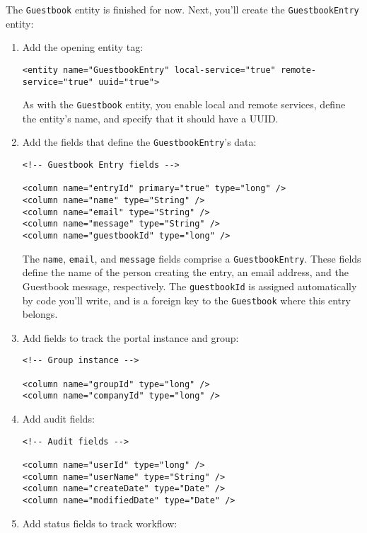 The \texttt{Guestbook} entity is finished for now. Next, you'll create
the \texttt{GuestbookEntry} entity:

\begin{enumerate}
\def\labelenumi{\arabic{enumi}.}
\item
  Add the opening entity tag:

\begin{verbatim}
<entity name="GuestbookEntry" local-service="true" remote-service="true" uuid="true">
\end{verbatim}

  As with the \texttt{Guestbook} entity, you enable local and remote
  services, define the entity's name, and specify that it should have a
  UUID.
\item
  Add the fields that define the \texttt{GuestbookEntry}'s data:

\begin{verbatim}
<!-- Guestbook Entry fields -->

<column name="entryId" primary="true" type="long" />
<column name="name" type="String" />
<column name="email" type="String" />
<column name="message" type="String" />
<column name="guestbookId" type="long" />
\end{verbatim}

  The \texttt{name}, \texttt{email}, and \texttt{message} fields
  comprise a \texttt{GuestbookEntry}. These fields define the name of
  the person creating the entry, an email address, and the Guestbook
  message, respectively. The \texttt{guestbookId} is assigned
  automatically by code you'll write, and is a foreign key to the
  \texttt{Guestbook} where this entry belongs.
\item
  Add fields to track the portal instance and group:

\begin{verbatim}
<!-- Group instance -->

<column name="groupId" type="long" />
<column name="companyId" type="long" />
\end{verbatim}
\item
  Add audit fields:

\begin{verbatim}
<!-- Audit fields -->

<column name="userId" type="long" />
<column name="userName" type="String" />
<column name="createDate" type="Date" />
<column name="modifiedDate" type="Date" />
\end{verbatim}
\item
  Add status fields to track workflow:


\end{enumerate}

